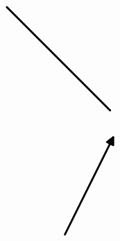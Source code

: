 \documentclass[10pt]{article}
\theoremstyle{plain}
\theoremstyle{remark}
\begin{document}
\[\begin{pgfpicture}
\begin{pgfscope}
\pgfpathlineto{\pgfqpoint{0.582123in}{1.891339in}}%
\pgfpathlineto{\pgfqpoint{0.511728in}{1.820314in}}%
\pgfpathclose%
\pgfusepath{stroke,fill}%
\end{pgfscope}%
\begin{pgfscope}%
\pgfpathrectangle{\pgfqpoint{0.224216in}{0.187957in}}{\pgfqpoint{3.754528in}{5.640000in}} %
\pgfusepath{clip}%
\pgfsetroundcap%
\pgfsetroundjoin%
\pgfsetlinewidth{2.007500pt}%
\definecolor{currentstroke}{rgb}{0.000000,0.000000,0.000000}%
\pgfsetstrokecolor{currentstroke}%
\pgfsetdash{}{0pt}%
\pgfpathmoveto{\pgfqpoint{2.218972in}{0.494880in}}%
\pgfpathquadraticcurveto{\pgfqpoint{2.569697in}{1.200257in}}{\pgfqpoint{2.906595in}{1.877825in}}%
\pgfusepath{stroke}%
\end{pgfscope}%
\begin{pgfscope}%
\pgfpathrectangle{\pgfqpoint{0.224216in}{0.187957in}}{\pgfqpoint{3.754528in}{5.640000in}} %
\pgfusepath{clip}%
\pgfsetroundcap%
\pgfsetroundjoin%
\definecolor{currentfill}{rgb}{0.000000,0.000000,0.000000}%
\pgfsetfillcolor{currentfill}%
\pgfsetlinewidth{2.007500pt}%
\definecolor{currentstroke}{rgb}{0.000000,0.000000,0.000000}%
\pgfsetstrokecolor{currentstroke}%
\pgfsetdash{}{0pt}%
\pgfpathmoveto{\pgfqpoint{2.817302in}{1.810543in}}%
\pgfpathlineto{\pgfqpoint{2.906595in}{1.877825in}}%
\pgfpathlineto{\pgfqpoint{2.906845in}{1.766022in}}%
\pgfpathlineto{\pgfqpoint{2.817302in}{1.810543in}}%
\pgfpathclose%
\pgfusepath{stroke,fill}%
\end{pgfscope}%
\begin{pgfscope}%
\pgfpathrectangle{\pgfqpoint{0.224216in}{0.187957in}}{\pgfqpoint{3.754528in}{5.640000in}} %
\pgfusepath{clip}%
\pgfsetroundcap%
\pgfsetroundjoin%
\pgfsetlinewidth{2.007500pt}%
\definecolor{currentstroke}{rgb}{0.000000,0.000000,0.000000}%
\pgfsetstrokecolor{currentstroke}%
\pgfsetdash{}{0pt}%
\pgfpathmoveto{\pgfqpoint{2.862496in}{2.260921in}}%
\pgfpathquadraticcurveto{\pgfqpoint{2.116403in}{3.007957in}}{\pgfqpoint{1.392257in}{3.733018in}}%
\pgfusepath{stroke}%
\end{pgfscope}%
\begin{pgfscope}%
\pgfpathrectangle{\pgfqpoint{0.224216in}{0.187957in}}{\pgfqpoint{3.754528in}{5.640000in}} %
\pgfusepath{clip}%
\pgfsetroundcap%
\pgfsetroundjoin%
\definecolor{currentfill}{rgb}{0.000000,0.000000,0.000000}%
\pgfsetfillcolor{currentfill}%
\pgfsetlinewidth{2.007500pt}%
\definecolor{currentstroke}{rgb}{0.000000,0.000000,0.000000}%
\pgfsetstrokecolor{currentstroke}%
\pgfsetdash{}{0pt}%
\pgfpathmoveto{\pgfqpoint{1.427545in}{3.626930in}}%
\pgfpathlineto{\pgfqpoint{1.392257in}{3.733018in}}%

\end{pgfscope}
\end{pgfpicture}\]
\end{document}
